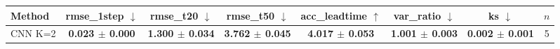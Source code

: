 \begin{tabular}{lccccccc}
\toprule
Method & rmse\_1step $\downarrow$ & rmse\_t20 $\downarrow$ & rmse\_t50 $\downarrow$ & acc\_leadtime $\uparrow$ & var\_ratio $\downarrow$ & ks $\downarrow$ & $n$ \\
\midrule
CNN K=2 & \textbf{0.023 $\pm$ 0.000} & \textbf{1.300 $\pm$ 0.034} & \textbf{3.762 $\pm$ 0.045} & \textbf{4.017 $\pm$ 0.053} & \textbf{1.001 $\pm$ 0.003} & \textbf{0.002 $\pm$ 0.001} & 5 \\
\bottomrule
\end{tabular}
